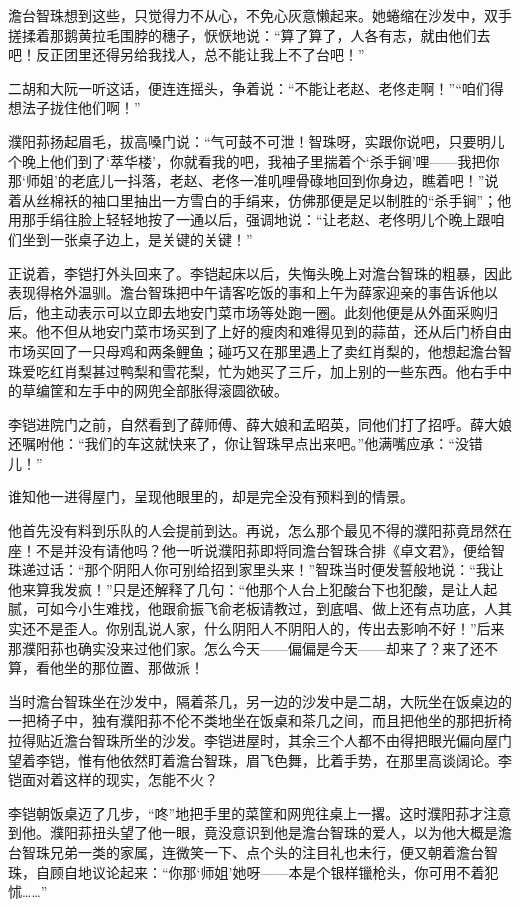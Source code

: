 \par 澹台智珠想到这些，只觉得力不从心，不免心灰意懒起来。她蜷缩在沙发中，双手搓揉着那鹅黄拉毛围脖的穗子，恹恹地说：“算了算了，人各有志，就由他们去吧！反正团里还得另给我找人，总不能让我上不了台吧！”
\par 二胡和大阮一听这话，便连连摇头，争着说：“不能让老赵、老佟走啊！”“咱们得想法子拢住他们啊！”
\par 濮阳荪扬起眉毛，拔高嗓门说：“气可鼓不可泄！智珠呀，实跟你说吧，只要明儿个晚上他们到了‘萃华楼’，你就看我的吧，我袖子里揣着个‘杀手锏’哩——我把你那‘师姐’的老底儿一抖落，老赵、老佟一准叽哩骨碌地回到你身边，瞧着吧！”说着从丝棉袄的袖口里抽出一方雪白的手绢来，仿佛那便是足以制胜的“杀手锏”；他用那手绢往脸上轻轻地按了一通以后，强调地说：“让老赵、老佟明儿个晚上跟咱们坐到一张桌子边上，是关键的关键！”
\par 正说着，李铠打外头回来了。李铠起床以后，失悔头晚上对澹台智珠的粗暴，因此表现得格外温驯。澹台智珠把中午请客吃饭的事和上午为薛家迎亲的事告诉他以后，他主动表示可以立即去地安门菜市场等处跑一圈。此刻他便是从外面采购归来。他不但从地安门菜市场买到了上好的瘦肉和难得见到的蒜苗，还从后门桥自由市场买回了一只母鸡和两条鲤鱼；碰巧又在那里遇上了卖红肖梨的，他想起澹台智珠爱吃红肖梨甚过鸭梨和雪花梨，忙为她买了三斤，加上别的一些东西。他右手中的草编筐和左手中的网兜全部胀得滚圆欲破。
\par 李铠进院门之前，自然看到了薛师傅、薛大娘和孟昭英，同他们打了招呼。薛大娘还嘱咐他：“我们的车这就快来了，你让智珠早点出来吧。”他满嘴应承：“没错儿！”
\par 谁知他一进得屋门，呈现他眼里的，却是完全没有预料到的情景。
\par 他首先没有料到乐队的人会提前到达。再说，怎么那个最见不得的濮阳荪竟昂然在座！不是并没有请他吗？他一听说濮阳荪即将同澹台智珠合排《卓文君》，便给智珠递过话：“那个阴阳人你可别给招到家里头来！”智珠当时便发誓般地说：“我让他来算我发疯！”只是还解释了几句：“他那个人台上犯酸台下也犯酸，是让人起腻，可如今小生难找，他跟俞振飞俞老板请教过，到底唱、做上还有点功底，人其实还不是歪人。你别乱说人家，什么阴阳人不阴阳人的，传出去影响不好！”后来那濮阳荪也确实没来过他们家。怎么今天——偏偏是今天——却来了？来了还不算，看他坐的那位置、那做派！
\par 当时澹台智珠坐在沙发中，隔着茶几，另一边的沙发中是二胡，大阮坐在饭桌边的一把椅子中，独有濮阳荪不伦不类地坐在饭桌和茶几之间，而且把他坐的那把折椅拉得贴近澹台智珠所坐的沙发。李铠进屋时，其余三个人都不由得把眼光偏向屋门望着李铠，惟有他依然盯着澹台智珠，眉飞色舞，比着手势，在那里高谈阔论。李铠面对着这样的现实，怎能不火？
\par 李铠朝饭桌迈了几步，“咚”地把手里的菜筐和网兜往桌上一撂。这时濮阳荪才注意到他。濮阳荪扭头望了他一眼，竟没意识到他是澹台智珠的爱人，以为他大概是澹台智珠兄弟一类的家属，连微笑一下、点个头的注目礼也未行，便又朝着澹台智珠，自顾自地议论起来：“你那‘师姐’她呀——本是个银样镴枪头，你可用不着犯怵……”

